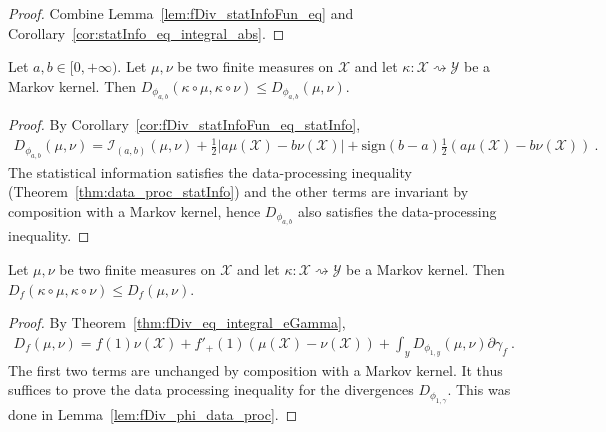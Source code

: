 \begin{proof}\leanok
{}
Combine Lemma~\ref{lem:fDiv_statInfoFun_eq} and Corollary~\ref{cor:statInfo_eq_integral_abs}.
\end{proof}


\begin{lemma}
  \label{lem:fDiv_phi_data_proc}
  \leanok
  Let $a,b \in [0, +\infty)$. Let $\mu, \nu$ be two finite measures on $\mathcal X$ and let $\kappa : \mathcal X \rightsquigarrow \mathcal Y$ be a Markov kernel.
  Then $D_{\phi_{a,b}}(\kappa \circ \mu, \kappa \circ \nu) \le D_{\phi_{a,b}}(\mu, \nu)$.
\end{lemma}

\begin{proof}\leanok
{}
By Corollary~\ref{cor:fDiv_statInfoFun_eq_statInfo},
\begin{align*}
D_{\phi_{a,b}}(\mu, \nu) = \mathcal I_{(a,b)}(\mu, \nu) + \frac{1}{2} \left\vert a \mu(\mathcal X) - b \nu(\mathcal X) \right\vert + \text{sign}(b-a)\frac{1}{2}(a \mu(\mathcal X) - b \nu(\mathcal X))
\: .
\end{align*}
The statistical information satisfies the data-processing inequality (Theorem~\ref{thm:data_proc_statInfo}) and the other terms are invariant by composition with a Markov kernel, hence $D_{\phi_{a,b}}$ also satisfies the data-processing inequality.
\end{proof}


\begin{theorem}
  \label{thm:fDiv_data_proc_2}
  \leanok
  Let $\mu, \nu$ be two finite measures on $\mathcal X$ and let $\kappa : \mathcal X \rightsquigarrow \mathcal Y$ be a Markov kernel.
  Then $D_f(\kappa \circ \mu, \kappa \circ \nu) \le D_f(\mu, \nu)$.
\end{theorem}

\begin{proof}\leanok
{}
By Theorem~\ref{thm:fDiv_eq_integral_eGamma},
\begin{align*}
D_f(\mu, \nu) = f(1) \nu(\mathcal X) + f'_+(1) (\mu(\mathcal X) - \nu (\mathcal X)) + \int_y D_{\phi_{1,y}}(\mu, \nu) \partial\gamma_f \: .
\end{align*}
The first two terms are unchanged by composition with a Markov kernel. It thus suffices to prove the data processing inequality for the divergences $D_{\phi_{1, \gamma}}$. This was done in Lemma~\ref{lem:fDiv_phi_data_proc}.
\end{proof}


